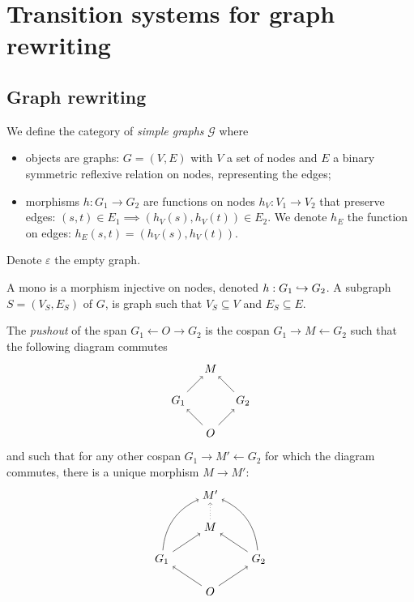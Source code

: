 \section{Transition systems for graph rewriting}

\subsection{Graph rewriting}

\begin{definition}
  We define the category of \emph{simple graphs} $\mathcal{G}$ where
  \begin{itemize}
  \item objects are graphs: $G = (V,E)$ with $V$ a set of nodes and $E$ a binary symmetric reflexive relation on nodes, representing the edges;
  \item morphisms $h:G_1\to G_2$ are functions on nodes $h_V:V_1\to V_2$ that preserve edges: $(s,t)\in E_1\implies (h_V(s),h_V(t))\in E_2$. We denote $h_E$ the function on edges: $h_E(s,t) = (h_V(s), h_V(t))$.
  \end{itemize}
  Denote $\varepsilon$ the empty graph.
\end{definition}

A mono is a morphism injective on nodes, denoted $h:G_1\hookrightarrow G_2$. A subgraph $S = (V_S,E_S)$ of $G$, is graph such that $V_S\subseteq V$ and $E_S\subseteq E$.

\begin{definition}[Pushout]
  The \emph{pushout} of the span $G_1\leftarrow O\rightarrow G_2$ is the cospan $G_1\rightarrow M\leftarrow G_2$ such that the following diagram commutes
  \[
  \begin{tikzpicture} %
    \node (o) at (0,-1) {\(O\)};
    \node (l1) at (-1,0) {\(G_1\)};
    \node (l2) at (1,0) {\(G_2\)};
    \node (m) at (0,1) {\(M\)};
    \draw [->] (o) --  (l1);
    \draw [->] (o) --  (l2);
    \draw [->] (l1) --  (m);
    \draw [->] (l2) --  (m);
  \end{tikzpicture}
  \]
  and such that for any other cospan $G_1\rightarrow M'\leftarrow G_2$ for which the diagram commutes, there is a unique morphism $M\to M'$:
  \[
  \begin{tikzpicture} %
    \node (mp) at (0,2) {\(M'\)};
    \node (o) at (0,-1) {\(O\)};
    \node (l1) at (-1.5,0) {\(G_1\)};
    \node (l2) at (1.5,0) {\(G_2\)};
    \node (m) at (0,1) {\(M\)};
    \draw [->] (o) --  (l1);
    \draw [->] (o) --  (l2);
    \draw [->] (l1) --  (m);
    \draw [->] (l2) --  (m);
    \draw [->] (l1) to [bend left] (mp);
    \draw [->] (l2) to [bend right] (mp);
    \draw [->, dotted] (m) -- (mp);
  \end{tikzpicture}
  \]
\end{definition}

